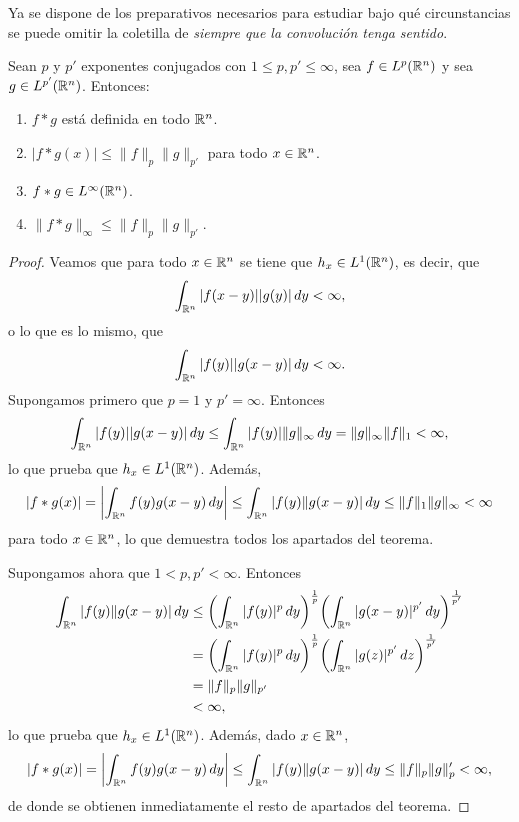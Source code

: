 \documentclass[a4paper, 11pt, oneside]{report}
\begin{document}
Ya se dispone de los preparativos necesarios para estudiar bajo qué circunstancias se puede omitir la coletilla de \emph{siempre que la convolución tenga sentido}.

\begin{theorem}\label{teo:2.1.4}
  Sean $p$ y $p'$ exponentes conjugados con $1 \leq p,p' \leq \infty$, sea $f \in L^p(\mathbb R^n)$ y sea $g \in L^{p'}(\mathbb R^n)$. Entonces:
  \begin{enumerate}
    \item $f \ast g$ está definida en todo $\mathbb R^n$.
    \item $|f \ast g (x) | \leq \|f\|_p\|g\|_{p'}$ para todo $x \in \mathbb R^n$.
    \item $f \ast g \in L^{\infty}(\mathbb R^n)$.
    \item $\|f \ast g\|_\infty \leq \|f\|_p\|g\|_{p'}$.
  \end{enumerate}
\end{theorem}

\begin{proof}
  Veamos que para todo $x \in \mathbb R^n$ se tiene que $h_x \in L^1(\mathbb R^n)$, es decir, que
  \[\int_{\mathbb R^n} |f(x-y)| |g(y)| \, dy < \infty,\]
  o lo que es lo mismo, que
  \[\int_{\mathbb R^n} |f(y)| |g(x-y)| \, dy < \infty.\]
  Supongamos primero que $p = 1$ y $p' = \infty$. Entonces 
  \[\int_{\mathbb R^n} |f(y)| |g(x-y)| \, dy \leq \int_{\mathbb R^n} |f(y)|\|g\|_{\infty} \, dy = \|g\|_\infty \|f\|_1 < \infty, \]
  lo que prueba que $h_x \in L^1(\mathbb R^n)$. Además,
  \[|f \ast g(x)| = \biggl|\int_{\mathbb R^n}f(y) g(x-y) \, dy\biggr| \leq \int_{\mathbb R^n} |f(y)\|g(x-y)| \, dy \leq \|f\|_1 \|g\|_\infty < \infty\]
  para todo $x \in \mathbb R^n$, lo que demuestra todos los apartados del teorema. 
  
  Supongamos ahora que $1 <p,p'<\infty$. Entonces
  \[\begin{aligned}[t]
    \int_{\mathbb R^n} |f(y)\|g(x-y)| \, dy &\leq \biggl(\int_{\mathbb R^n}|f(y)|^p \, dy\biggr)^{\frac{1}{p}}\biggl(\int_{\mathbb R^n} |g(x-y)|^{p'} \, dy\biggr)^{\frac{1}{p'}} \\
    &= \biggl(\int_{\mathbb R^n}|f(y)|^p \, dy\biggr)^{\frac{1}{p}}\biggl(\int_{\mathbb R^n} |g(z)|^{p'} \, dz\biggr)^{\frac{1}{p'}} \\
    &= \|f\|_p\|g\|_{p'} \\
    &< \infty,
  \end{aligned}\]
  lo que prueba que $h_x \in L^1(\mathbb R^n)$. Además, dado $x \in \mathbb R^n$,
  \[|f \ast g(x)| = \biggl|\int_{\mathbb R^n}f(y) g(x-y) \, dy\biggr| \leq \int_{\mathbb R^n} |f(y)\|g(x-y)| \, dy \leq \|f\|_p \|g\|_p' < \infty,\]
  de donde se obtienen inmediatamente el resto de apartados del teorema.
\end{proof}
\end{document}
